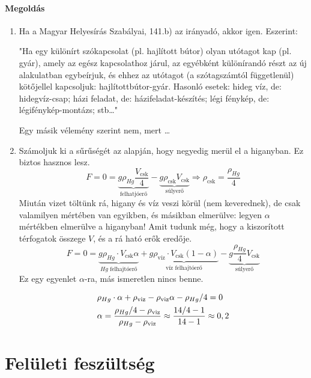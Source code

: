 \documentclass[12pt,a4paper]{scrartcl}
\begin{document}
\paragraph{Megoldás}
\begin{enumerate}
\item Ha a Magyar Helyesírás Szabályai, 141.b) az irányadó, akkor igen. Eszerint:

"Ha egy különírt szókapcsolat (pl. hajlított bútor) olyan utótagot kap (pl. gyár), amely az egész kapcsolathoz járul, az egyébként különírandó részt az új alakulatban egybeírjuk, és ehhez az utótagot (a szótagszámtól függetlenül) kötőjellel kapcsoljuk: hajlítottbútor-gyár. Hasonló esetek: hideg víz, de: hidegvíz-csap; házi feladat, de: házifeladat-készítés; légi fénykép, de: légifénykép-montázs; stb\ldots"

Egy másik vélemény szerint nem, mert \ldots
\item Számoljuk ki a sűrűségét az alapján, hogy negyedig merül el a higanyban. Ez biztos hasznos lesz.
\[F = 0 = \underbrace {g{\rho _{Hg}}\frac{{{V_{{\text{csk}}}}}}{4}}_{{\text{felhatjóerő}}} - \underbrace {g{\rho _{{\text{csk}}}}{V_{{\text{csk}}}}}_{{\text{súlyerő}}} \Rightarrow {\rho _{{\text{csk}}}} = \frac{{{\rho _{Hg}}}}{4}\]
Miután vizet töltünk rá, higany és víz veszi körül (nem keverednek), de csak valamilyen mértében van egyikben, és másikban elmerülve: legyen $\alpha$ mértékben elmerülve a higanyban! Amit tudunk még, hogy a kiszorított térfogatok összege $V$, és a rá ható erők eredője.
\[F = 0 = \underbrace {g{\rho _{Hg}}\cdot{V_{{\text{csk}}}} \alpha }_{Hg{\text{ felhajtóerő}}} + \underbrace {g{\rho _{{\text{víz}}}}\cdot{V_{{\text{csk}}}} \left( {1 - \alpha } \right)}_{{\text{víz felhajtóerő}}} - \underbrace {g\frac{{{\rho _{Hg}}}}{4}{V_{{\text{csk}}}}}_{{\text{súlyerő}}}\]
Ez egy egyenlet $\alpha$-ra, más ismeretlen nincs benne.

\[\begin{gathered}
  {\rho _{Hg}} \cdot \alpha  + {\rho _{{\text{viz}}}} - {\rho _{{\text{viz}}}}\alpha  - {\rho _{Hg}}/4 = 0 \hfill \\
  \alpha  = \frac{{{\rho _{Hg}}/4 - {\rho _{{\text{viz}}}}}}{{{\rho _{Hg}} - {\rho _{{\text{viz}}}}}} \approx \frac{{14/4 - 1}}{{14 - 1}} \approx 0,2 \hfill \\ 
\end{gathered} \]
\end{enumerate}
\normalsize
\section{Felületi feszültség}
\footnotesize
\end{document}

